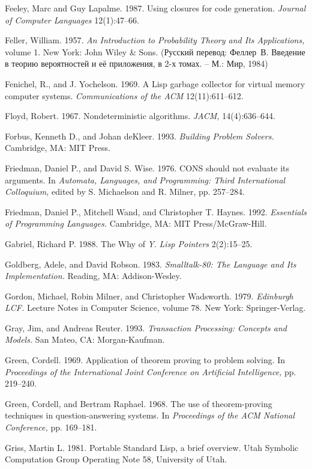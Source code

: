 {Feeley, Marc and Guy Lapalme.  1987.  Using closures for code
generation.  {\em Journal of Computer Languages} 12(1):47--66.

Feller, William.  1957.  {\em An Introduction to Probability Theory
and Its Applications,} volume 1. New York: John Wiley \&
Sons. (Русский перевод: Феллер~В. Введение в теорию вероятностей и её
приложения, в 2-х томах. -- М.: Мир, 1984)

Fenichel, R., and J. Yochelson.  1969.  A Lisp garbage collector for
virtual memory computer systems.  {\em Communications of the ACM}
12(11):611--612.

Floyd, Robert. 1967. Nondeterministic algorithms. {\em JACM,} 14(4):636--644.

Forbus, Kenneth D., and Johan deKleer.  1993. {\em Building Problem
Solvers.} Cam\-bridge, MA: MIT Press.

Friedman, Daniel P., and David S. Wise.  1976.  CONS should not
evaluate its arguments. In {\em Automata, Languages, and Programming:
Third International Col\-loquium,} edited by S. Michaelson and R.
Milner, pp. 257--284.

Friedman, Daniel P., Mitchell Wand, and Christopher T. Haynes. 1992.
{\em Essentials of Programming Languages.}  Cambridge, MA: MIT
Press/McGraw-Hill.

Gabriel, Richard P. 1988.  The Why of {\em Y}.  {\em Lisp Pointers}
2(2):15--25.

Goldberg, Adele, and David Robson.  1983.  {\em Smalltalk-80: The
Language and Its Implementation.} Reading, MA: Addison-Wesley.

Gordon, Michael, Robin Milner, and Christopher Wadsworth.  1979.  {\em Edinburgh LCF.} Lecture Notes in Computer Science, volume 78. New
York: Springer-Verlag.

Gray, Jim, and Andreas Reuter. 1993. {\em Transaction Processing:
Concepts and Models.} San Mateo, CA: Morgan-Kaufman.

Green, Cordell.  1969.  Application of theorem proving to problem
solving.  In {\em Pro\-ceed\-ings of the International Joint Conference on
Artificial Intelligence,} pp. 219--240.

Green, Cordell, and Bertram Raphael.  1968.  The use of
theorem-proving tech\-niques in question-answering systems.  In {\em Proceedings of the ACM National Con\-fe\-rence,} pp. 169--181.

Griss, Martin L.  1981.  Portable Standard Lisp, a brief overview.
Utah Symbolic Computation Group Operating Note 58, University of Utah.

}
